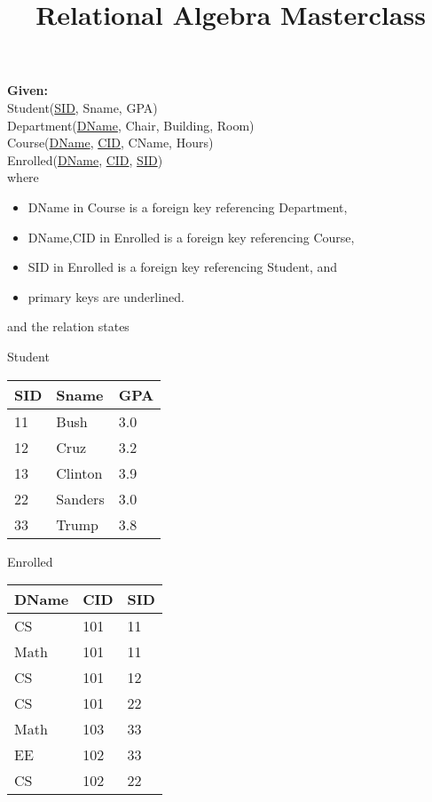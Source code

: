 \documentclass[10pt]{article}
\title{Relational Algebra Masterclass}
\date{}
\begin{document}
\maketitle

{\large {\bf Given:}}\\

Student(\underline{SID}, Sname, GPA)\\

Department(\underline{DName}, Chair, Building, Room)\\

Course(\underline{DName}, \underline{CID}, CName, Hours)\\

Enrolled(\underline{DName}, \underline{CID}, \underline{SID})\\

where
\begin{itemize}
\item DName in Course is a foreign key referencing Department,
\item DName,CID in Enrolled is a foreign key referencing Course,
\item SID in Enrolled is a foreign key referencing Student, and
\item primary keys are underlined.
\end{itemize}

and the relation states\\

\begin{multicols}{2}

Student\\
\begin{tabular}{|l|l|l|}\hline
\rowcolor{lightgray}  SID & Sname & GPA \\\hline
11 & Bush & 3.0 \\\hline
12 & Cruz & 3.2 \\\hline
13 & Clinton & 3.9 \\\hline
22 & Sanders& 3.0 \\\hline
33 & Trump & 3.8 \\\hline
\end{tabular}

\columnbreak

Enrolled\\
\begin{tabular}{|l|l|l|}\hline
\rowcolor{lightgray} DName & CID & SID \\\hline
CS & 101 & 11 \\\hline
Math & 101 & 11 \\\hline
CS & 101 & 12 \\\hline
CS & 101 & 22 \\\hline
Math & 103 & 33 \\\hline
EE & 102 & 33 \\\hline
CS & 102 & 22 \\\hline
\end{tabular}

\end{multicols}
\end{document}
